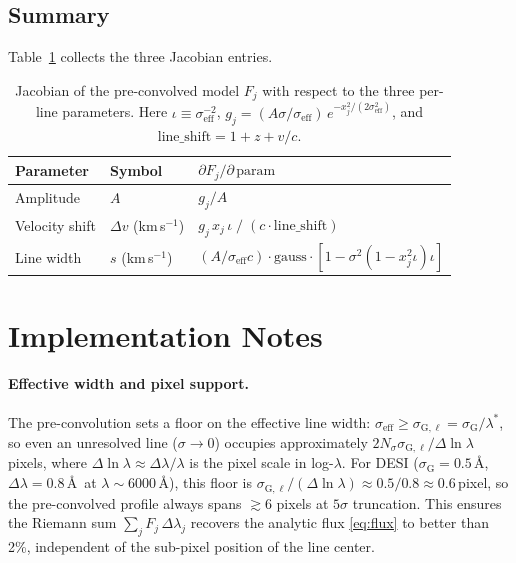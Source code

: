 \documentclass[12pt]{article}
\newcommand{\lstar}{\lambda^{*}}
\newcommand{\sG}{\sigma_{\mathrm{G}}}
\newcommand{\sGl}{\sigma_{\mathrm{G},\ell}}   %
\newcommand{\seff}{\sigma_{\mathrm{eff}}}
\newcommand{\C}{c}                             %
\begin{document}

\subsection{Summary}

Table~\ref{tab:jacobian} collects the three Jacobian entries.

\begin{table}[h]
\centering
\renewcommand{\arraystretch}{1.6}
\begin{tabular}{@{}lll@{}}
\toprule
Parameter & Symbol & $\partial F_j/\partial\,\text{param}$ \\
\midrule
Amplitude    & $A$   &
  $g_j / A$
  \\
Velocity shift & $\Delta v$ (km\,s$^{-1}$) &
  $g_j\,x_j\,\iota\;/\;(\C\cdot\text{line\_shift})$
  \\
Line width   & $s$ (km\,s$^{-1}$) &
  $(A/\seff\C)\cdot\text{gauss}\cdot
   [1 - \sigma^2(1-x_j^2\iota)\iota]$
  \\
\bottomrule
\end{tabular}
\caption{Jacobian of the pre-convolved model $F_j$ with respect to the
  three per-line parameters. Here $\iota\equiv\seff^{-2}$,
  $g_j = (A\sigma/\seff)\,e^{-x_j^2/(2\seff^2)}$, and
  $\text{line\_shift}=1+z+v/\C$.}
\label{tab:jacobian}
\end{table}


\section{Implementation Notes}
\label{sec:impl}

\paragraph{Effective width and pixel support.}
The pre-convolution sets a floor on the effective line width:
$\seff \geq \sGl = \sG/\lstar$, so even an unresolved line
($\sigma\to 0$) occupies approximately $2N_\sigma\sGl/\Delta\!\ln\lambda$
pixels, where $\Delta\!\ln\lambda \approx \Delta\lambda/\lambda$ is the
pixel scale in log-$\lambda$.  For DESI ($\sG=0.5$\,\AA,
$\Delta\lambda=0.8$\,\AA\ at $\lambda\sim6000$\,\AA), this floor is
$\sGl/(\Delta\ln\lambda) \approx 0.5/0.8 \approx 0.6$\,pixel, so the
pre-convolved profile always spans $\gtrsim 6$ pixels at $5\sigma$ truncation.
This ensures the Riemann sum $\sum_j F_j\,\Delta\lambda_j$ recovers the
analytic flux \eqref{eq:flux} to better than 2\%, independent of the
sub-pixel position of the line center.
\end{document}
